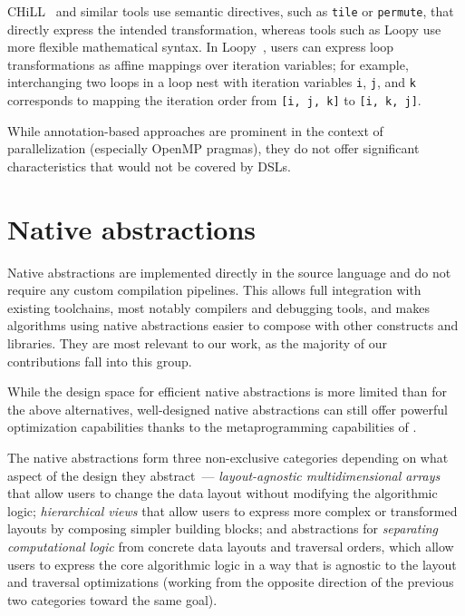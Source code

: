 CHiLL~\cite{chen2008chill} and similar tools use semantic directives, such as \lstinline{tile} or \lstinline{permute}, that directly express the intended transformation, whereas tools such as Loopy use more flexible mathematical syntax.
In Loopy~\cite{namjoshi2016loopy}, users can express loop transformations as affine mappings over iteration variables; for example, interchanging two loops in a loop nest with iteration variables \lstinline{i}, \lstinline{j}, and \lstinline{k} corresponds to mapping the iteration order from \lstinline{[i, j, k]} to \lstinline{[i, k, j]}.

While annotation-based approaches are prominent in the context of parallelization (especially OpenMP pragmas), they do not offer significant characteristics that would not be covered by DSLs.


\section{Native abstractions}\label{sec:native-abstractions}

Native abstractions are implemented directly in the source language and do not require any custom compilation pipelines. This allows full integration with existing \cpp toolchains, most notably compilers and debugging tools, and makes algorithms using native abstractions easier to compose with other \cpp constructs and libraries. They are most relevant to our work, as the majority of our contributions fall into this group.

While the design space for efficient native abstractions is more limited than for the above alternatives, well-designed native abstractions can still offer powerful optimization capabilities thanks to the metaprogramming capabilities of \cpp.

The native abstractions form three non-exclusive categories depending on what aspect of the design they abstract~--- \emph{layout-agnostic multidimensional arrays} that allow users to change the data layout without modifying the algorithmic logic; \emph{hierarchical views} that allow users to express more complex or transformed layouts by composing simpler building blocks; and abstractions for \emph{separating computational logic} from concrete data layouts and traversal orders, which allow users to express the core algorithmic logic in a way that is agnostic to the layout and traversal optimizations (working from the opposite direction of the previous two categories toward the same goal).

